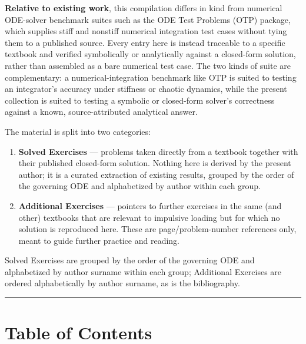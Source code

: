 \documentclass[
  11pt,
]{article}
\providecommand{\tightlist}{%
  \setlength{\itemsep}{0pt}\setlength{\parskip}{0pt}}
\begin{document}
\textbf{Relative to existing work}, this compilation differs in kind
from numerical ODE-solver benchmark suites such as the ODE Test Problems
(OTP) package, which supplies stiff and nonstiff numerical integration
test cases without tying them to a published source. Every entry here is
instead traceable to a specific textbook and verified symbolically or
analytically against a closed-form solution, rather than assembled as a
bare numerical test case. The two kinds of suite are complementary: a
numerical-integration benchmark like OTP is suited to testing an
integrator's accuracy under stiffness or chaotic dynamics, while the
present collection is suited to testing a symbolic or closed-form
solver's correctness against a known, source-attributed analytical
answer.

The material is split into two categories:

\begin{enumerate}
\def\labelenumi{\arabic{enumi}.}
\tightlist
\item
  \textbf{Solved Exercises} --- problems taken directly from a textbook
  together with their published closed-form solution. Nothing here is
  derived by the present author; it is a curated extraction of existing
  results, grouped by the order of the governing ODE and alphabetized by
  author within each group.
\item
  \textbf{Additional Exercises} --- pointers to further exercises in the
  same (and other) textbooks that are relevant to impulsive loading but
  for which no solution is reproduced here. These are
  page/problem-number references only, meant to guide further practice
  and reading.
\end{enumerate}

Solved Exercises are grouped by the order of the governing ODE and
alphabetized by author surname within each group; Additional Exercises
are ordered alphabetically by author surname, as is the bibliography.

\begin{center}\rule{0.5\linewidth}{0.5pt}\end{center}

\hypertarget{table-of-contents}{%
\section{Table of Contents}\label{table-of-contents}}
\end{document}
